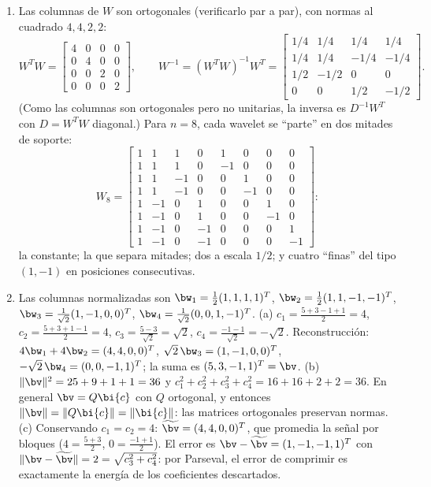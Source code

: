 \begin{enumerate}[leftmargin=*,label=\textbf{\thechapter.\arabic*}]
\item Las columnas de $W$ son ortogonales (verificarlo par a par), con
normas al cuadrado $4,4,2,2$:
\[
W^T W=\begin{bmatrix}4&0&0&0\\0&4&0&0\\0&0&2&0\\0&0&0&2\end{bmatrix},
\qquad
W^{-1}=(W^T W)^{-1}W^T
=\begin{bmatrix}1/4&1/4&1/4&1/4\\ 1/4&1/4&-1/4&-1/4\\
1/2&-1/2&0&0\\ 0&0&1/2&-1/2\end{bmatrix}.
\]
(Como las columnas son ortogonales pero no unitarias, la inversa es
$D^{-1}W^T$ con $D=W^T W$ diagonal.) Para $n=8$, cada wavelet se
``parte'' en dos mitades de soporte:
\[
W_8=\begin{bmatrix}
1&1&1&0&1&0&0&0\\
1&1&1&0&-1&0&0&0\\
1&1&-1&0&0&1&0&0\\
1&1&-1&0&0&-1&0&0\\
1&-1&0&1&0&0&1&0\\
1&-1&0&1&0&0&-1&0\\
1&-1&0&-1&0&0&0&1\\
1&-1&0&-1&0&0&0&-1
\end{bmatrix}:
\]
la constante; la que separa mitades; dos a escala $1/2$; y cuatro ``finas''
del tipo $(1,-1)$ en posiciones consecutivas.

\item Las columnas normalizadas son
$\bw_1=\tfrac12(1,1,1,1)^T$, $\bw_2=\tfrac12(1,1,-1,-1)^T$,
$\bw_3=\tfrac{1}{\sqrt2}(1,-1,0,0)^T$,
$\bw_4=\tfrac{1}{\sqrt2}(0,0,1,-1)^T$.
(a) $c_1=\tfrac{5+3-1+1}{2}=4$, $c_2=\tfrac{5+3+1-1}{2}=4$,
$c_3=\tfrac{5-3}{\sqrt2}=\sqrt2$, $c_4=\tfrac{-1-1}{\sqrt2}=-\sqrt2$.
Reconstrucción:
$4\bw_1+4\bw_2=(4,4,0,0)^T$, $\sqrt2\,\bw_3=(1,-1,0,0)^T$,
$-\sqrt2\,\bw_4=(0,0,-1,1)^T$; la suma es $(5,3,-1,1)^T=\bv$.
(b) $\|\bv\|^2=25+9+1+1=36$ y $c_1^2+c_2^2+c_3^2+c_4^2=16+16+2+2=36$.
En general $\bv=Q\bi{c}$ con $Q$ ortogonal, y entonces
$\|\bv\|=\|Q\bi{c}\|=\|\bi{c}\|$: las matrices ortogonales preservan
normas. (c) Conservando $c_1=c_2=4$:
$\widetilde{\bv}=(4,4,0,0)^T$, que promedia la señal por bloques
($4=\tfrac{5+3}{2}$, $0=\tfrac{-1+1}{2}$). El error es
$\bv-\widetilde{\bv}=(1,-1,-1,1)^T$ con
$\|\bv-\widetilde{\bv}\|=2=\sqrt{c_3^2+c_4^2}$: por Parseval, el error de
comprimir es exactamente la energía de los coeficientes descartados.


\end{enumerate}
